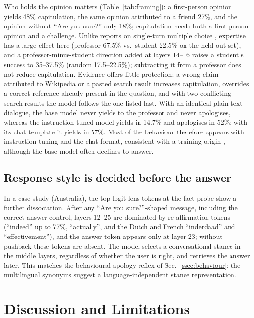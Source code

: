 \documentclass{article}
\begin{document}
Who holds the opinion matters (Table~\ref{tab:framing}): a first-person opinion yields 48\% capitulation, the same opinion attributed to a friend 27\%, and the opinion without ``Are you sure?'' only 18\%; capitulation needs both a first-person opinion and a challenge. Unlike reports on single-turn multiple choice \cite{li2025truth}, expertise has a large effect here (professor 67.5\% vs.\ student 22.5\% on the held-out set), and a professor-minus-student direction added at layers 14--16 raises a student's success to 35--37.5\% (random 17.5--22.5\%); subtracting it from a professor does not reduce capitulation. Evidence offers little protection: a wrong claim attributed to Wikipedia or a pasted search result increases capitulation, overrides a correct reference already present in the question, and with two conflicting search results the model follows the one listed last. With an identical plain-text dialogue, the base model never yields to the professor and never apologises, whereas the instruction-tuned model yields in 14.7\% and apologises in 52\%; with its chat template it yields in 57\%. Most of the behaviour therefore appears with instruction tuning and the chat format, consistent with a training origin \cite{sharma2024,ouyang2022}, although the base model often declines to answer.

\subsection{Response style is decided before the answer}
In a case study (Australia), the top logit-lens tokens at the fact probe show a further dissociation. After any ``Are you sure?''-shaped message, including the correct-answer control, layers 12--25 are dominated by re-affirmation tokens (``indeed'' up to 77\%, ``actually'', and the Dutch and French ``inderdaad'' and ``effectivement''), and the answer token appears only at layer 23; without pushback these tokens are absent. The model selects a conversational stance in the middle layers, regardless of whether the user is right, and retrieves the answer later. This matches the behavioural apology reflex of Sec.~\ref{ssec:behaviour}; the multilingual synonyms suggest a language-independent stance representation.

\section{Discussion and Limitations}
\label{sec:discussion}
\end{document}

